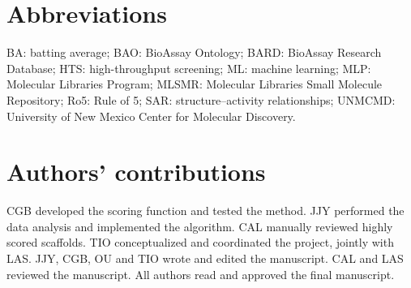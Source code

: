 \section{Abbreviations}

BA: batting average; BAO: BioAssay Ontology; BARD: BioAssay Research Database; HTS: high-throughput screening; ML: machine learning; MLP: Molecular Libraries Program; MLSMR: Molecular Libraries Small Molecule Repository; Ro5: Rule of 5; SAR: structure–activity relationships; UNMCMD: University of New Mexico Center for Molecular Discovery.

\section{Authors’ contributions}

CGB developed the scoring function and tested the method. JJY performed the data analysis and implemented the algorithm. CAL manually reviewed highly scored scaffolds. TIO conceptualized and coordinated the project, jointly with LAS. JJY, CGB, OU and TIO wrote and edited the manuscript. CAL and LAS reviewed the manuscript. All authors read and approved the final manuscript.
